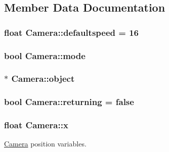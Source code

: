 \subsection{Member Data Documentation}
\hypertarget{class_camera_a283eb5bb21146d7b8b12763c731c9b38}{
\subsubsection[{defaultspeed}]{\setlength{\rightskip}{0pt plus 5cm}float Camera\-::defaultspeed = 16}}\label{class_camera_a283eb5bb21146d7b8b12763c731c9b38}
\hypertarget{class_camera_ac1b290d582f215ce1b0d13aa4dbb5f5a}{
\subsubsection[{mode}]{\setlength{\rightskip}{0pt plus 5cm}bool Camera\-::mode}}\label{class_camera_ac1b290d582f215ce1b0d13aa4dbb5f5a}
\hypertarget{class_camera_ad836de76be258c26164908b9a5caf770}{
\subsubsection[{object}]{$\ast$ Camera\-::object}}\label{class_camera_ad836de76be258c26164908b9a5caf770}
\hypertarget{class_camera_aca4707f8b35c7376b736ff825522eb37}{
\subsubsection[{returning}]{\setlength{\rightskip}{0pt plus 5cm}bool Camera\-::returning = false}}\label{class_camera_aca4707f8b35c7376b736ff825522eb37}
\hypertarget{class_camera_ae270fbd3b09b36f240a2d55b3b5b9cec}{
\subsubsection[{x}]{\setlength{\rightskip}{0pt plus 5cm}float Camera\-::x}}\label{class_camera_ae270fbd3b09b36f240a2d55b3b5b9cec}


\hyperlink{class_camera}{Camera} position variables. 

